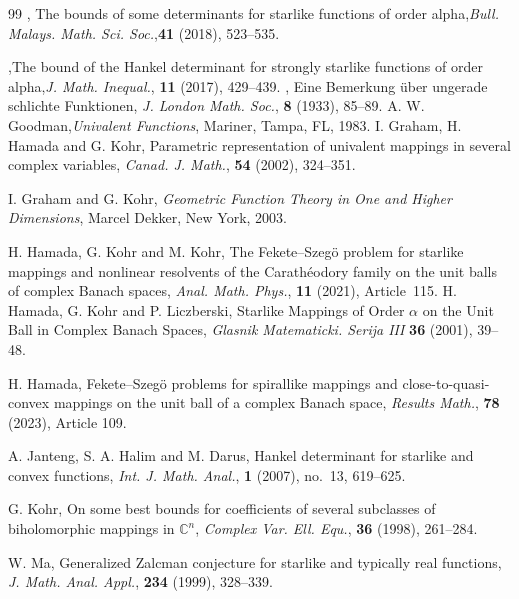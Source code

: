 \documentclass[11pt, reqno]{amsart}
\numberwithin{equation}{section}
\begin{document}
\begin{thebibliography}{99}
,
The bounds of some determinants for starlike functions of order alpha,\textit{Bull. Malays. Math. Sci. Soc.},\textbf{41} (2018), 523--535.

,The bound of the Hankel determinant for strongly starlike functions of order alpha,\textit{J. Math. Inequal.}, \textbf{11} (2017), 429--439.
, Eine Bemerkung \"uber ungerade schlichte Funktionen, \textit{J. London Math. Soc.}, \textbf{8} (1933), 85--89.
 {\sc A. W. Goodman},\textit{Univalent Functions}, Mariner, Tampa, FL, 1983.
 {\sc I. Graham, H. Hamada and G. Kohr}, Parametric representation of univalent mappings in several complex variables, \textit{Canad. J. Math.}, \textbf{54} (2002), 324--351.

 {\sc I. Graham and G. Kohr}, \textit{Geometric Function Theory in One and Higher Dimensions},
Marcel Dekker, New York, 2003.

 {\sc H. Hamada, G. Kohr and M. Kohr}, The Fekete--Szeg\"o problem for starlike mappings and nonlinear resolvents of the Carath\'eodory family on the unit balls of complex Banach spaces,
\textit{Anal. Math. Phys.}, \textbf{11} (2021), Article~115.
 {\sc H. Hamada, G. Kohr and P. Liczberski}, Starlike Mappings of Order $\alpha$ on the Unit Ball in Complex Banach Spaces,
\textit{Glasnik Matematicki. Serija III} \textbf{36} (2001), 39--48.

 {\sc H. Hamada}, Fekete--Szeg\"o problems for spirallike mappings and close-to-quasi-convex mappings on the unit ball of a complex Banach space, \textit{Results Math.}, \textbf{78} (2023), Article 109.

 {\sc A. Janteng, S. A. Halim and M. Darus}, Hankel determinant for starlike and convex functions, \textit{Int. J. Math. Anal.}, \textbf{1} (2007), no.~13, 619--625. 

 {\sc G. Kohr}, On some best bounds for coefficients of several subclasses of biholomorphic mappings in $\mathbb{C}^{n}$, \textit{Complex Var. Ell. Equ.}, \textbf{36} (1998), 261--284.

 {\sc W. Ma}, Generalized Zalcman conjecture for starlike and typically real functions, \textit{J. Math. Anal. Appl.}, \textbf{234} (1999), 328--339.


\end{thebibliography}
\end{document}
